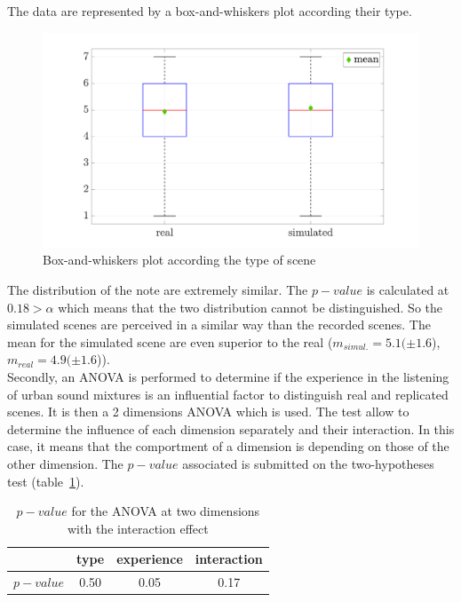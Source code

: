 \documentclass[a4,11pt,twocolumn]{article}
\begin{document}
The data are represented by a box-and-whiskers plot according their type. 
\begin{figure}[hbtp]
\centering
\includegraphics[width=\linewidth]{./pictures/testPerceptif_boxplotType_EN.pdf}
\caption{Box-and-whiskers plot according the type of scene}
\label{fig:boxplot_real_simul}
\end{figure}

The distribution of the note are extremely similar. The $p-value$ is calculated at $0.18 > \alpha$ which means that the two distribution cannot be distinguished. So the simulated scenes are perceived in a similar way than the recorded scenes. The mean for the simulated scene are even superior to the real ($m_{simul.} = 5.1 (\pm 1.6$), $ m_{real} = 4.9 (\pm 1.6$)). \\

Secondly, an ANOVA is performed to determine if the experience in the listening of urban sound mixtures is an influential factor to distinguish real and replicated scenes. It is then a 2 dimensions ANOVA which is used. The test allow to determine  the influence of each dimension separately and their interaction. In this case, it means that the comportment of a dimension is depending on those of the other dimension. The $p-value$ associated is submitted on the two-hypotheses test (table~\ref{tab:p_value_type_exp}).\\

\begin{table}[h]
\centering
\begin{tabular}{cccc}
\cline{2-4}
          & type & experience & interaction \\
\hline
$p-value$ & 0.50 & 0.05 & 0.17 \\
\hline    
\end{tabular}
\caption{$p-value$ for the ANOVA at two dimensions with the interaction effect}
\label{tab:p_value_type_exp}
\end{table}
\end{document}
